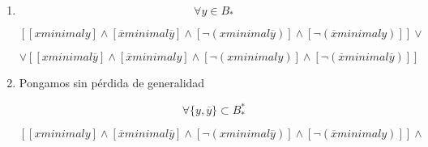 \documentclass[
]{article}
\providecommand{\tightlist}{%
  \setlength{\itemsep}{0pt}\setlength{\parskip}{0pt}}
\begin{document}
\begin{enumerate}
\begin{enumerate}
\begin{enumerate}
\begin{enumerate}
\begin{enumerate}
\begin{enumerate}
            \begin{enumerate}
            \def\labelenumvii{\arabic{enumvii}.}
            \tightlist
            \item
              \[{\overline{x} \cdot y} = \overline{x}\]
            \item
              \[{{y = {{\overline{x} \cdot y} + {x \cdot y}}} = {\overline{x} + x}} = 1\]
            \end{enumerate}
          \item
            Supongamos\[y \neq 1\]

            \begin{enumerate}
            \def\labelenumvii{\arabic{enumvii}.}
            \tightlist
            \item
              \[\neg{({\overline{x}{\mathsf{\mathit{minimal}}y}})}\]
            \item
              \[{\overline{x} \cdot y} = 0\]
            \item
              \[{x + \overline{y}} = 1\]
            \item
              \[\overline{x}\mathsf{\mathit{minimal}}\overline{y}\]
            \end{enumerate}
          \end{enumerate}
        \end{enumerate}
      \item
        \[\forall{y \in B_{\ast}}\]

        \[\left\lbrack {{{\left\lbrack {x\mathsf{\mathit{minimal}}y} \right\rbrack \land \left\lbrack {\overline{x}\mathsf{\mathit{minimal}}\overline{y}} \right\rbrack} \land \left\lbrack {\neg{({x\mathsf{\mathit{minimal}}\overline{y}})}} \right\rbrack} \land \left\lbrack {\neg{({\overline{x}\mathsf{\mathit{minimal}}y})}} \right\rbrack} \right\rbrack \vee\]

        \[\vee \left\lbrack {{{\left\lbrack {x\mathsf{\mathit{minimal}}\overline{y}} \right\rbrack \land \left\lbrack {\overline{x}\mathsf{\mathit{minimal}}y} \right\rbrack} \land \left\lbrack {\neg{({x\mathsf{\mathit{minimal}}y})}} \right\rbrack} \land \left\lbrack {\neg{({\overline{x}\mathsf{\mathit{minimal}}\overline{y}})}} \right\rbrack} \right\rbrack\]
      \item
        Pongamos sin pérdida de generalidad

        \[\forall{{\{{y,\overline{y}}\}} \subset B_{\ast}^{\ast}}\]

        \[\left\lbrack {{{\left\lbrack {x\mathsf{\mathit{minimal}}y} \right\rbrack \land \left\lbrack {\overline{x}\mathsf{\mathit{minimal}}\overline{y}} \right\rbrack} \land \left\lbrack {\neg{({x\mathsf{\mathit{minimal}}\overline{y}})}} \right\rbrack} \land \left\lbrack {\neg{({\overline{x}\mathsf{\mathit{minimal}}y})}} \right\rbrack} \right\rbrack \land\]


\end{enumerate}
\end{enumerate}
\end{enumerate}
\end{enumerate}
\end{document}
